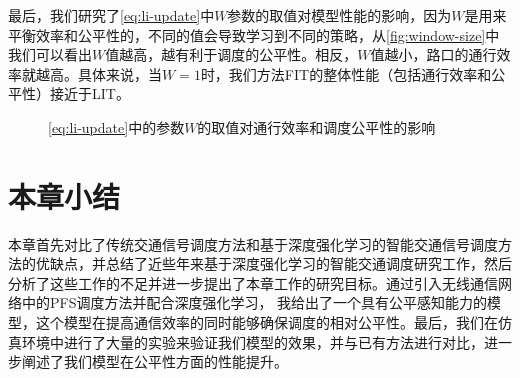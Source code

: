 最后，我们研究了\autoref{eq:li-update}中$W$参数的取值对模型性能的影响，因为$W$是用来平衡效率和公平性的，不同的值会导致学习到不同的策略，从\autoref{fig:window-size}中我们可以看出$W$值越高，越有利于调度的公平性。相反，$W$值越小，路口的通行效率就越高。具体来说，当$W=1$时，我们方法FIT的整体性能（包括通行效率和公平性）接近于LIT。
\begin{figure}[htb]
    \caption{\autoref{eq:li-update}中的参数$W$的取值对通行效率和调度公平性的影响}
    \label{fig:window-size}
  \end{figure}

\section{本章小结}
本章首先对比了传统交通信号调度方法和基于深度强化学习的智能交通信号调度方法的优缺点，并总结了近些年来基于深度强化学习的智能交通调度研究工作，然后分析了这些工作的不足并进一步提出了本章工作的研究目标。通过引入无线通信网络中的PFS调度方法并配合深度强化学习，
我给出了一个具有公平感知能力的模型，这个模型在提高通信效率的同时能够确保调度的相对公平性。最后，我们在仿真环境中进行了大量的实验来验证我们模型的效果，并与已有方法进行对比，进一步阐述了我们模型在公平性方面的性能提升。